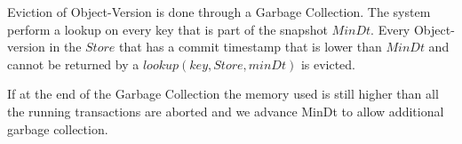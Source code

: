 \documentclass[systeme,french,english]{compas2022}
\begin{document}
Eviction of Object-Version is done through a Garbage Collection.
The system perform a lookup on every key that is part of the snapshot $\mathit{MinDt}$.
Every Object-version in the $\mathit{Store}$ that has a commit timestamp that is lower than $\mathit{MinDt}$ and cannot be returned by a $\mathit{lookup(key,Store,minDt)}$ is evicted.

If at the end of the Garbage Collection the memory used is still higher than all the running transactions are aborted and we advance MinDt to allow additional garbage collection.




\end{document}
